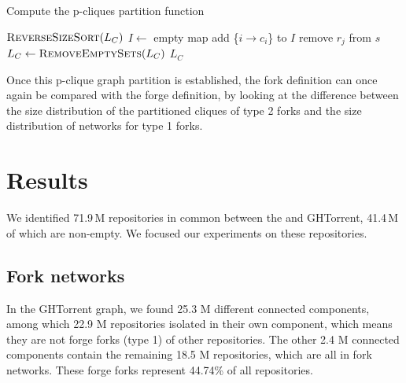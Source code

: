 \begin{algorithm}[t]
    \caption{Compute the p-cliques partition function}
    \label{algo:fork-clique-partition}
    \begin{algorithmic}
        \State $\Call{ReverseSizeSort}{L_C}$ 
        \State $I \gets$ empty map 
            \State add \{$i \rightarrow c_i$\} to $I$
        \EndFor
                    \vspace{-\baselineskip}
                        \State remove $r_j$ from $s$
                    \EndIf
                \EndFor
            \EndFor
        \EndFor
        \State $L_C \gets \Call{RemoveEmptySets}{L_C}$ 
        \State \Return $L_C$
    \EndFunction
    \end{algorithmic}
\end{algorithm}

Once this p-clique graph partition is established, the fork definition can once
again be compared with the forge definition, by looking at the difference
between the size distribution of the partitioned cliques of type 2 forks and
the size distribution of networks for type 1 forks.


\section{Results}
\label{sec:forks-results}

We identified 71.9\,M repositories in common between the \SWHGD{} and GHTorrent,
41.4\,M of which are non-empty. We focused our experiments on these
repositories.

\subsection{Fork networks}
\label{sec:results-fork-networks}

In the GHTorrent graph, we found 25.3 M different connected components, among
which 22.9 M repositories isolated in their own component, which means they are
not forge forks (type 1) of other repositories.  The other 2.4 M connected
components contain the remaining 18.5 M repositories, which are all in fork
networks.  These forge forks represent 44.74\% of all repositories.

